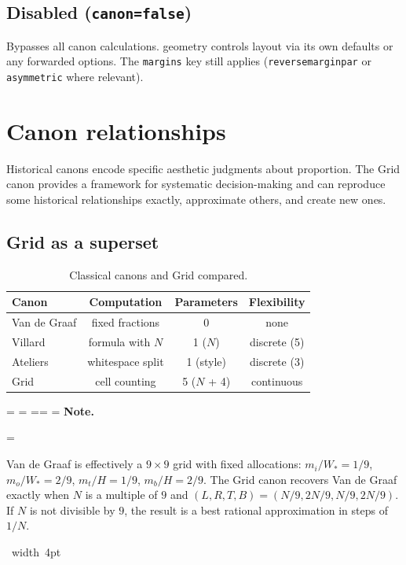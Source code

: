 \documentclass[11pt, twoside, openany]{book}
\makeatletter
\newcommand{\pkg}[1]{\textsf{#1}}
\newcommand*{\cns@tag@artifact@begin}{}
\newcommand*{\cns@tag@artifact@end}{}
\newenvironment{TodoNote}[1][]{%
  \par\addvspace{0.5\baselineskip plus 2pt}%
  \setbox\cns@box=\vbox\bgroup
    \hsize=\linewidth
    \advance\hsize -10pt
    \linewidth=\hsize \columnwidth=\hsize
    \parindent=\z@
    \noindent\textbf{\sffamily Note\cns@ifnotempty{#1}{ \textmd{(#1)}}.}%
    \par\nobreak
    \@afterindentfalse\@afterheading
    \leftskip=\cns@indent\relax
    \ignorespaces
}{%
  \par
  \egroup
  \vbox{\hbox{%
    \cns@tag@artifact@begin\vrule width 4pt\cns@tag@artifact@end
    \hskip 6pt\relax
    \box\cns@box
  }}%
  \par\addvspace{0.5\baselineskip plus 2pt}%
}
\makeatother
\begin{document}
\section{Disabled (\texttt{canon=false})}\label{sec:false}

Bypasses all canon calculations. \pkg{geometry} controls layout via its own defaults or any forwarded options. The \texttt{margins} key still applies (\texttt{reversemarginpar} or \texttt{asymmetric} where relevant).


\chapter{Canon relationships}\label{chapter:relationships}

Historical canons encode specific aesthetic judgments about proportion. The Grid canon provides a framework for systematic decision-making and can reproduce some historical relationships exactly, approximate others, and create new ones.

\section{Grid as a superset}\label{sec:superset}

\begin{table}[h]
	\centering
	\caption{Classical canons and Grid compared.}
    \label{tab:superset}
	\begin{tabular}{@{}lccc@{}}
		\toprule
		\bfseries Canon & \bfseries Computation & \bfseries Parameters & \bfseries Flexibility \\
		\midrule
		Van de Graaf    & fixed fractions       & 0                    & none                  \\
		Villard         & formula with $N$      & 1 ($N$)              & discrete (5)          \\
		Ateliers        & whitespace split      & 1 (style)            & discrete (3)          \\
		Grid            & cell counting         & 5 ($N$ + 4)          & continuous            \\
		\bottomrule
	\end{tabular}
\end{table}

\begin{TodoNote}
	Van de Graaf is effectively a $9 \times 9$ grid with fixed allocations: $m_i/W_\ast=1/9$, $m_o/W_\ast=2/9$, $m_t/H=1/9$, $m_b/H=2/9$. The Grid canon recovers Van de Graaf exactly when $N$ is a multiple of $9$ and $(L,R,T,B) = (N/9, 2N/9, N/9, 2N/9)$. If $N$ is not divisible by $9$, the result is a best rational approximation in steps of $1/N$.
\end{TodoNote}
\end{document}
